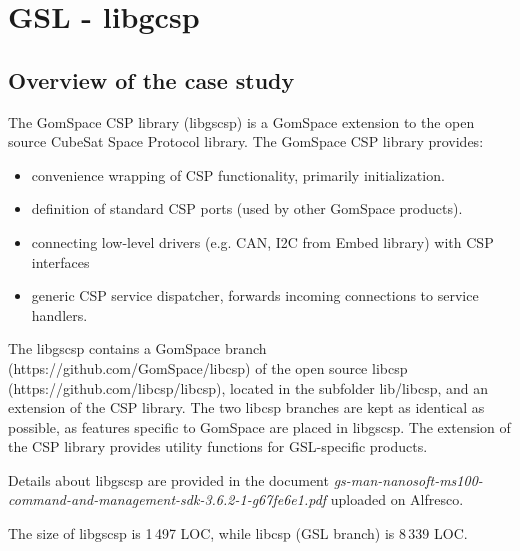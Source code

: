 
\clearpage

\section{GSL - libgcsp}
\label{sec:caseStudies:GSL:libgcsp}

\subsection{Overview of the case study}

The GomSpace CSP library (libgscsp) is a GomSpace extension to the open source CubeSat Space Protocol library.
The GomSpace CSP library provides:
\begin{itemize}
\item convenience wrapping of CSP functionality, primarily initialization.
\item definition of standard CSP ports (used by other GomSpace products).
\item connecting low-level drivers (e.g. CAN, I2C from Embed library) with CSP interfaces 
\item generic CSP service dispatcher, forwards incoming connections to service handlers.
\end{itemize}

The libgscsp contains a GomSpace branch (https://github.com/GomSpace/libcsp) of the open source libcsp (https://github.com/libcsp/libcsp), located in the subfolder lib/libcsp, and an extension of the CSP library. The two libcsp branches are kept as identical as possible, as features specific to GomSpace are placed in libgscsp. The extension of the CSP library provides utility functions for GSL-specific products.

Details about libgscsp are provided in the document \emph{gs-man-nanosoft-ms100-command-and-management-sdk-3.6.2-1-g67fe6e1.pdf} uploaded on Alfresco.


The size of libgscsp is 1\,497 LOC, %
while libcsp (GSL branch) is 8\,339 LOC. %


